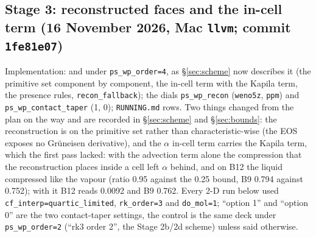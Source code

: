 \documentclass[11pt,a4paper]{article}
\newcommand{\code}[1]{\texttt{\small #1}}
\begin{document}
\subsection{Stage 3: reconstructed faces and the in-cell term (16 November 2026, Mac \code{llvm}; commit \code{1fe81e07})}
\label{sec:stage3}

Implementation:  and  under
\code{ps\_wp\_order=4}, as \S\ref{sec:scheme} now describes it (the
primitive set component by component, the in-cell term with the Kapila
term, the presence rules, \code{recon\_fallback}); the dials
\code{ps\_wp\_recon} (\code{weno5z}, \code{ppm}) and
\code{ps\_wp\_contact\_taper} (1, 0); \code{RUNNING.md} rows.  Two things
changed from the plan on the way and are recorded in \S\ref{sec:scheme}
and \S\ref{sec:bounds}: the reconstruction is on the primitive set rather
than characteristic-wise (the EOS exposes no Gr\"uneisen derivative), and
the $\alpha$ in-cell term carries the Kapila term, which the first pass
lacked: with the advection term alone the compression that the
reconstruction places inside a cell left $\alpha$ behind, and on B12 the
liquid compressed like the vapour (ratio 0.95 against the 0.25 bound,
B9 0.794 against 0.752); with it B12 reads 0.0092 and B9 0.762.  Every
2-D run below used \code{cf\_interp=quartic\_limited}, \code{rk\_order=3}
and \code{do\_mol=1}; ``option 1'' and ``option 0'' are the two contact-taper
settings, the control is the same deck under \code{ps\_wp\_order=2}
(``rk3 order 2'', the Stage 2b/2d scheme) unless said otherwise.
\end{document}
